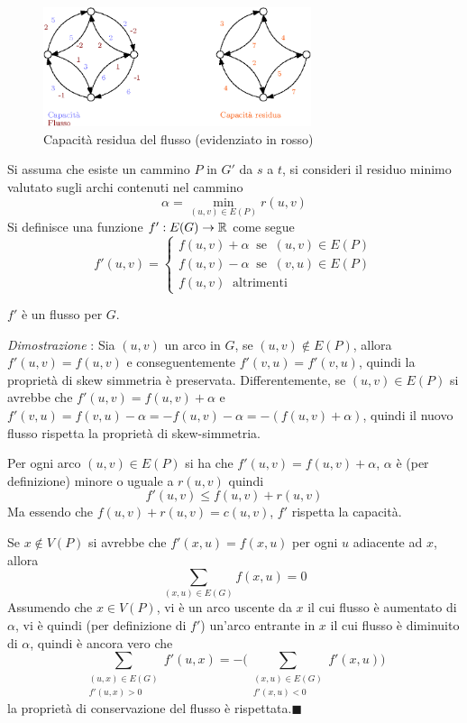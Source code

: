 \documentclass[10pt, letterpaper]{report}
\begin{document}
\begin{figure}[h!]
    \centering 
    \includegraphics[width=0.7\textwidth ]{images/residual_graph.eps}
    \caption{Capacità residua del flusso (evidenziato in rosso)}
\end{figure}
Si assuma che esiste un cammino $P$ in $G'$ da $s$ a $t$, si consideri il residuo minimo valutato sugli archi contenuti nel cammino 
$$ \alpha=\min_{(u,v)\in E(P)}r(u,v)$$
Si definisce una funzione $f':E(G)\rightarrow{\mathbb R}$ come segue $$ f'(u,v)=\begin{cases}
    f(u,v)+\alpha  \ \text{ se } \ (u,v)\in E(P) \\
    f(u,v)-\alpha  \ \text{ se } \ (v,u) \in E(P)\\
    f(u,v)  \ \text{ altrimenti } 
\end{cases}$$
\begin{proposizione}\label{prop:augmentation}
$f'$ è un flusso per $G$.
\end{proposizione}
\textit{Dimostrazione} : Sia $(u,v)$ un arco in $G$, se $(u,v)\notin E(P)$, allora $f'(u,v)=f(u,v)$ e conseguentemente $f'(v,u)=f'(v,u)$, quindi la proprietà di skew simmetria è preservata. Differentemente, se $(u,v)\in E(P)$ si avrebbe che $f'(u,v)=f(u,v)+\alpha$ e $f'(v,u)=f(v,u)-\alpha=-f(u,v)-\alpha=-(f(u,v)+\alpha)$, quindi il nuovo flusso rispetta la proprietà di skew-simmetria. 

Per ogni arco $(u,v)\in E(P)$ si ha che $f'(u,v)=f(u,v)+\alpha$, $\alpha$ è (per definizione) minore o uguale a $r(u,v)$ quindi 
$$ f'(u,v)\le f(u,v)+r(u,v)$$
Ma essendo che $f(u,v)+r(u,v)=c(u,v)$, $f'$ rispetta la capacità.

Se $x\notin V(P)$ si avrebbe che $f'(x,u)=f(x,u)$ per ogni $u$ adiacente ad $x$, allora $$ \sum_{(x,u)\in E(G)}f(x,u)=0$$
Assumendo che $x\in V(P)$,  vi è un arco uscente da $x$ il cui flusso è aumentato di $\alpha$, vi è quindi (per definizione di $f'$) un'arco entrante in $x$ il cui flusso è diminuito di $\alpha$, quindi è ancora vero che
$$ \sum_{\begin{matrix}(u,x)\in E(G)\\f'(u,x)>0\end{matrix}}f'(u,x)=-\Bigg(
\sum_{\begin{matrix}(x,u)\in E(G)\\f'(x,u)<0\end{matrix}}f'(x,u)\Bigg)$$
la proprietà di conservazione del flusso è rispettata.\hfill$\blacksquare$\bigskip 
\end{document}
